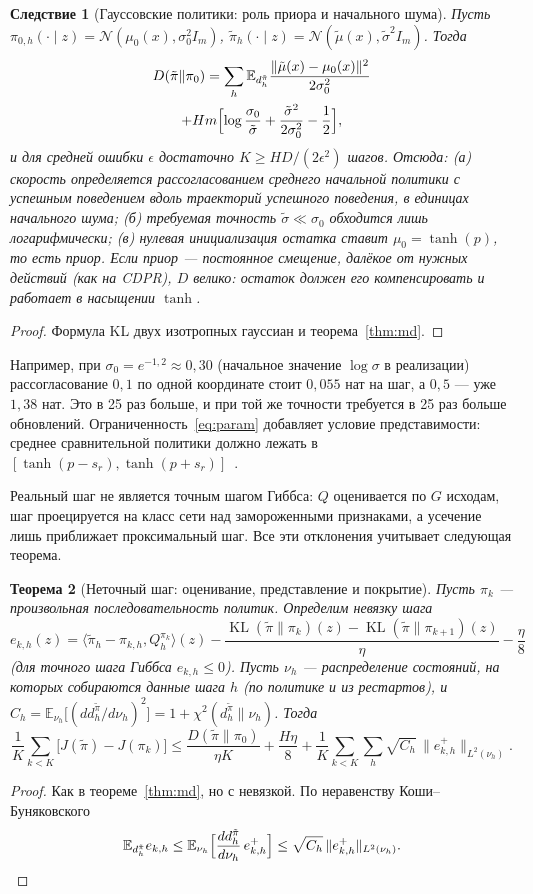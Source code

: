 \documentclass[11pt,a4paper]{article}
\theoremstyle{plain}
\newtheorem{theorem}{Теорема}[section]
\newtheorem{corollary}[theorem]{Следствие}
\theoremstyle{definition}
\theoremstyle{remark}
\newcommand{\E}{\mathbb{E}}
\DeclareMathOperator{\KL}{KL}
\newcommand{\ip}[2]{\langle #1,#2\rangle}
\newcommand{\pit}{\tilde\pi}
\begin{document}
\begin{corollary}[Гауссовские политики: роль приора и начального шума]\label{cor:gauss}
Пусть $\pi_{0,h}(\cdot\mid z)=\mathcal N(\mu_0(x),\sigma_0^2I_m)$, $\pit_h(\cdot\mid z)=\mathcal N(\tilde\mu(x),\tilde\sigma^2I_m)$. Тогда
\begin{multline*}
D(\pit\|\pi_0)=\sum_h\E_{d^{\pit}_h}\frac{\|\tilde\mu(x)-\mu_0(x)\|^2}{2\sigma_0^2}\\
+Hm\Bigl[\log\frac{\sigma_0}{\tilde\sigma}+\frac{\tilde\sigma^2}{2\sigma_0^2}-\frac12\Bigr],
\end{multline*}
и для средней ошибки $\epsilon$ достаточно $K\ge HD/(2\epsilon^2)$ шагов. Отсюда:
(а) скорость определяется рассогласованием среднего начальной политики с успешным поведением \emph{вдоль траекторий успешного поведения}, в единицах начального шума;
(б) требуемая точность $\tilde\sigma\ll\sigma_0$ обходится лишь логарифмически;
(в) нулевая инициализация остатка ставит $\mu_0=\tanh(p)$, то есть приор. Если приор --- постоянное смещение, далёкое от нужных действий (как на CDPR), $D$ велико: остаток должен его компенсировать и работает в насыщении $\tanh$.
\end{corollary}
\begin{proof}
Формула KL двух изотропных гауссиан и теорема~\ref{thm:md}.
\end{proof}

Например, при $\sigma_0=e^{-1{,}2}\approx0{,}30$ (начальное значение $\log\sigma$ в реализации) рассогласование $0{,}1$ по одной координате стоит $0{,}055$ нат на шаг, а $0{,}5$ --- уже $1{,}38$ нат. Это в 25 раз больше, и при той же точности требуется в 25 раз больше обновлений. Ограниченность~\eqref{eq:param} добавляет условие представимости: среднее сравнительной политики должно лежать в $[\tanh(p-s_r),\tanh(p+s_r)]$~\cite[\S6]{notes}.

Реальный шаг не является точным шагом Гиббса: $Q$ оценивается по $G$ исходам, шаг проецируется на класс сети над замороженными признаками, а усечение лишь приближает проксимальный шаг. Все эти отклонения учитывает следующая теорема.

\begin{theorem}[Неточный шаг: оценивание, представление и покрытие]\label{thm:md-inexact}
Пусть $\pi_k$ --- произвольная последовательность политик. Определим \emph{невязку шага}
\[
e_{k,h}(z)=\ip{\pit_h-\pi_{k,h}}{Q^{\pi_k}_h}(z)-\frac{\KL(\pit\|\pi_k)(z)-\KL(\pit\|\pi_{k+1})(z)}{\eta}-\frac\eta8
\]
(для точного шага Гиббса $e_{k,h}\le0$). Пусть $\nu_h$ --- распределение состояний, на которых собираются данные шага $h$ (по политике и из рестартов), и $C_h=\E_{\nu_h}\bigl[(dd^{\pit}_h/d\nu_h)^2\bigr]=1+\chi^2(d^{\pit}_h\|\nu_h)$. Тогда
\[
\frac1K\sum_{k<K}\bigl[J(\pit)-J(\pi_k)\bigr]\le\frac{D(\pit\|\pi_0)}{\eta K}+\frac{H\eta}8+\frac1K\sum_{k<K}\sum_h\sqrt{C_h}\,\bigl\|e^+_{k,h}\bigr\|_{L^2(\nu_h)} .
\]
\end{theorem}
\begin{proof}
Как в теореме~\ref{thm:md}, но с невязкой. По неравенству Коши--Буняковского
\[
\E_{d^{\pit}_h}e_{k,h}\le\E_{\nu_h}\Bigl[\frac{dd^{\pit}_h}{d\nu_h}\,e^+_{k,h}\Bigr]\le\sqrt{C_h}\,\|e^+_{k,h}\|_{L^2(\nu_h)} .
\]
\end{proof}
\end{document}

